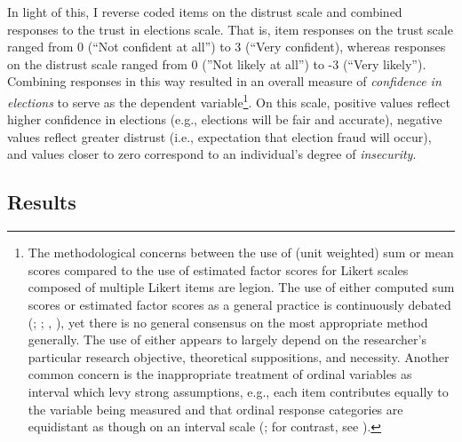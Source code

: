 \documentclass[
  12pt,
  letterpaper,
]{article}
\begin{document}
In light of this, I reverse coded items on the distrust scale and
combined responses to the trust in elections scale. That is, item
responses on the trust scale ranged from 0 (``Not confident at all'') to
3 (``Very confident), whereas responses on the distrust scale ranged
from 0 (''Not likely at all'') to -3 (``Very likely''). Combining
responses in this way resulted in an overall measure of \emph{confidence
in elections} to serve as the dependent variable\footnote{The
  methodological concerns between the use of (unit weighted) sum or mean
  scores compared to the use of estimated factor scores for Likert
  scales composed of multiple Likert items are legion. The use of either
  computed sum scores or estimated factor scores as a general practice
  is continuously debated (;
  ;
  ,
  ), yet there is no general consensus
  on the most appropriate method generally. The use of either appears to
  largely depend on the researcher's particular research objective,
  theoretical suppositions, and necessity. Another common concern is the
  inappropriate treatment of ordinal variables as interval which levy
  strong assumptions, e.g., each item contributes equally to the
  variable being measured and that ordinal response categories are
  equidistant as though on an interval scale
  (; for contrast, see
  ).}. On this scale,
positive values reflect higher confidence in elections (e.g., elections
will be fair and accurate), negative values reflect greater distrust
(i.e., expectation that election fraud will occur), and values closer to
zero correspond to an individual's degree of \emph{insecurity}.

\subsection{Results}\label{results}
\end{document}
